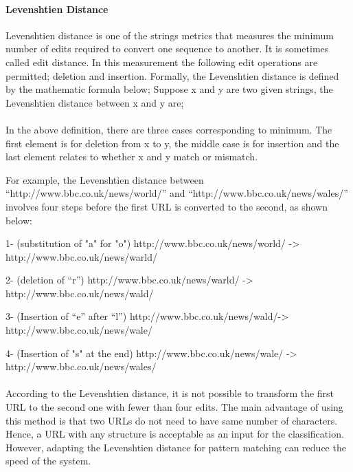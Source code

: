 \paragraph{Levenshtien Distance}
	
Levenshtien distance is one of the strings metrics that measures the minimum number of edits required to convert one sequence to another. It is sometimes called edit distance. In this measurement the following edit operations are permitted; deletion and insertion. 
Formally, the Levenshtien distance is defined by the mathematic formula below;
Suppose x and y are two given strings, the Levenshtien distance between x and y are;
%


%

\paragraph{} 
In the above definition, there are three cases corresponding to minimum. The first element is for deletion from x to y, the middle case is for insertion and the last element relates to whether x and y match or mismatch\cite{Levenshtein}.  

For example, the Levenshtien distance between “http://www.bbc.co.uk/news/world/” and “http://www.bbc.co.uk/news/wales/” involves four steps before the first URL is converted to the second, as shown below:

1-	(substitution of "a" for "o")
http://www.bbc.co.uk/news/world/ -> http://www.bbc.co.uk/news/warld/

2-	(deletion of “r”)
http://www.bbc.co.uk/news/warld/ -> http://www.bbc.co.uk/news/wald/

3-	(Insertion of “e” after “l”)
http://www.bbc.co.uk/news/wald/-> http://www.bbc.co.uk/news/wale/

4-	(Insertion of "s" at the end)
http://www.bbc.co.uk/news/wale/ -> http://www.bbc.co.uk/news/wales/

\paragraph{} 
According to the Levenshtien distance, it is not possible to transform the first URL to the second one with fewer than four edits. The main advantage of using this method is that two URLs do not need to have same number of characters. Hence, a URL with any structure is acceptable as an input for the classification. However, adapting the Levenshtien distance for pattern matching can reduce the speed of the system.

